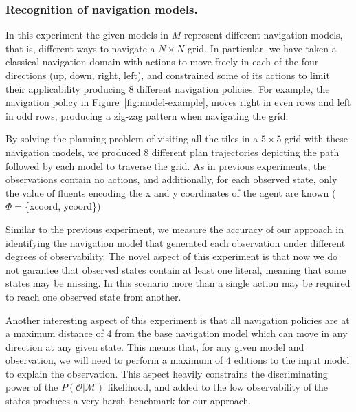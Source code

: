\documentclass[letterpaper]{article} %
\begin{document}
\subsubsection{Recognition of navigation models.} In this experiment the given models in $M$ represent different navigation models, that is, different ways to navigate a $N\times N$ grid. In particular, we have taken a classical navigation domain with actions to move freely in each of the four directions (up, down, right, left), and constrained some of its actions to limit their applicability producing 8 different navigation policies. For example, the navigation policy in Figure~\ref{fig:model-example}, moves right in even rows and left in odd rows, producing a zig-zag pattern when navigating the grid.

By solving the planning problem of visiting all the tiles in a $5\times 5$ grid with these navigation models, we produced 8 different plan trajectories depicting the path followed by each model to traverse the grid. As in previous experiments, the observations contain no actions, and additionally, for each observed state, only the value of fluents encoding the x and y coordinates of the agent are known ($\Phi =$\{xcoord, ycoord\})


Similar to the previous experiment, we measure the accuracy of our approach in identifying the navigation model that generated each observation under different degrees of observability. The novel aspect of this experiment is that now we do not garantee that observed states contain at least one literal, meaning that some states may be missing. In this scenario more than a single action may be required to reach one observed state from another. 

Another interesting aspect of this experiment is that all navigation policies are at a maximum distance of 4 from the base navigation model which can move in any direction at any given state. This means that, for any given model and observation, we will need to perform a maximum of 4 editions to the input model to explain the observation. This aspect heavily constrains the discriminating power of the $P(\mathcal{O}|\mathcal{M})$ likelihood, and added to the low observability of the states produces a very harsh benchmark for our approach.
\end{document}

